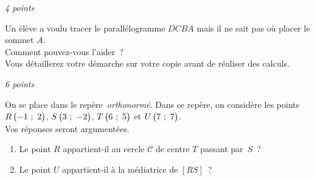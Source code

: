 \documentclass[a4paper,12pt,twocolumn,landscape]{article}
\begin{document}
\vspace*{1em}

\begin{minipage}{0.45\textwidth}
\thispagestyle{firststyle}

\vspace*{1em}

\exercice\hfill \emph{4 points}

Un élève a voulu tracer le parallélogramme $DCBA$ mais il ne sait pas où placer le sommet $A$.\\ Comment pouvez-vous l'aider~?\\ Vous détaillerez votre démarche sur votre copie avant de réaliser des calculs.

\begin{center}


\end{center}


\vspace*{2em}

\exercice\hfill \emph{6 points}

On se place dans le repère~\emph{orthonormé}. Dans ce repère, on considère les points $R\begin{pmatrix}-1~;~2\end{pmatrix}$, $S\begin{pmatrix}3~;~-2\end{pmatrix}$, $T\begin{pmatrix}6~;~5\end{pmatrix}$ et $U\begin{pmatrix}7~;~7\end{pmatrix}$.\\Vos réponses seront argumentées.

	\begin{enumerate}
		\item Le point $R$ appartient-il au cercle $\mathscr{C}$ de centre $T$ passant par~$S$~?
		\item Le point $U$ appartient-il à la médiatrice de $\left[RS\right]$~?
	\end{enumerate}



\vspace{-2em}


\end{minipage}
\newpage
\end{document}
